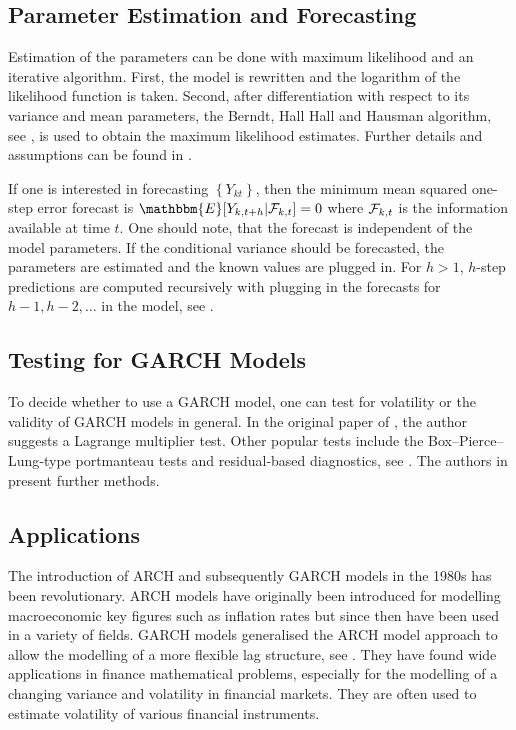 \subsection{Parameter Estimation and Forecasting}
\label{sec: GARCH Parameter Estimation and Forecasting}

Estimation of the parameters can be done with maximum likelihood and an iterative algorithm. First, the model is rewritten and the logarithm of the likelihood function is taken. Second, after differentiation with respect to its variance and mean parameters, the Berndt, Hall Hall and Hausman algorithm, see \textcite{Berndt:1974}, is used to obtain the maximum likelihood estimates. Further details and assumptions can be found in \textcite{Bollerslev:1986}. 

If one is interested in forecasting $\left\{Y_{kt}\right\}$, then the minimum mean squared one-step error forecast is $\mathbbm{E}[Y_{k,t+h}|\SigA_{k,t}]=0$ where $\mathcal{F}_{k,t}$ is the information available at time $t$. One should note, that the forecast is independent of the model parameters. If the conditional variance should be forecasted, the parameters are estimated and the known values are plugged in. For $h>1$, $h$-step predictions are computed recursively with plugging in the forecasts for $h-1,h-2,\ldots$ in the model, see \textcite{Zivot:2009}. 


\subsection{Testing for GARCH Models}
\label{sec: Testing for GARCH models}

To decide whether to use a GARCH model, one can test for volatility or the validity of GARCH models in general. In the original paper of \textcite{Bollerslev:1986}, the author suggests a Lagrange multiplier test. Other popular tests include the Box–Pierce–Lung‐type portmanteau tests and residual‐based diagnostics, see \textcite{Hong:2017}. The authors in \textcite{Hong:2017} present further methods. 


\subsection{Applications}
\label{sec: Garch Applications}

The introduction of ARCH and subsequently GARCH models in the 1980s has been revolutionary. ARCH models have originally been introduced for modelling macroeconomic key figures such as inflation rates but since then have been used in a variety of fields. GARCH models generalised the ARCH model approach to allow the modelling of a more flexible lag structure, see \textcite{Bollerslev:1986}. They have found wide applications in finance mathematical problems, especially for the modelling of a changing variance and volatility in financial markets. They are often used to estimate volatility of various financial instruments. 

